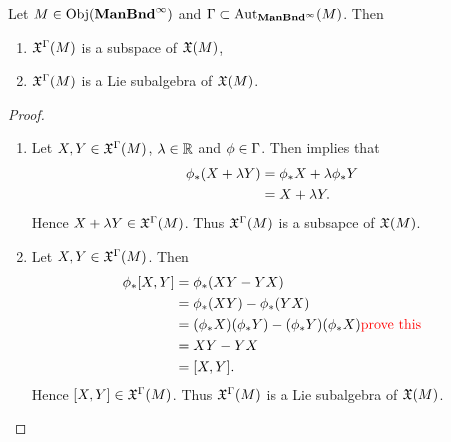 \documentclass{book}
\begin{document}
\begin{ex}
		Let $M \in \operatorname{Obj}(\operatorname*{\text{\textbf{ManBnd}}^{\infty}})$ and $\Gamma \subset \operatorname{Aut}_{\operatorname*{\text{\textbf{ManBnd}}^{\infty}}}(M)$. Then 
		\begin{enumerate}
			\item $\mathfrak{X}^{\Gamma}(M)$ is a subspace of $\mathfrak{X}(M)$,
			\item $\mathfrak{X}^{\Gamma}(M)$ is a Lie subalgebra of $\mathfrak{X}(M)$.
		\end{enumerate}
\end{ex}

\begin{proof}
	\begin{enumerate}
		\item Let $X, Y \in \mathfrak{X}^{\Gamma}(M)$, $\lambda \in \mathbb{R}$ and $\phi \in \Gamma$. Then   implies that 
		\begin{align*}
			\phi_*(X + \lambda Y)
			& = \phi_*X + \lambda \phi_*Y \\
			& = X + \lambda Y.
		\end{align*}
		Hence $X + \lambda Y \in \mathfrak{X}^{\Gamma}(M)$. Thus $\mathfrak{X}^{\Gamma}(M)$ is a subsapce of $\mathfrak{X}(M)$.
		\item Let $X, Y \in \mathfrak{X}^{\Gamma}(M)$. Then 
		\begin{align*}
			\phi_*[X, Y]
			& = \phi_*(XY - YX) \\
			& = \phi_*(XY) - \phi_*(YX) \\
			& = (\phi_*X) (\phi_*Y)- (\phi_* Y) (\phi_*X) \textcolor{red}{\text{prove this}} \\ 
			& = XY - YX \\
			& = [X,Y].
		\end{align*}
		Hence $[X, Y] \in \mathfrak{X}^{\Gamma}(M)$. Thus $\mathfrak{X}^{\Gamma}(M)$ is a Lie subalgebra of $\mathfrak{X}(M)$.
	\end{enumerate}
\end{proof}
\end{document}
